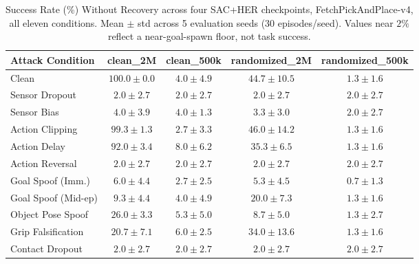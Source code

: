 \documentclass[conference]{IEEEtran}
\begin{document}
\begin{table}[t]
\centering
\caption{Success Rate (\%) Without Recovery across four SAC+HER checkpoints,
FetchPickAndPlace-v4, all eleven conditions. Mean $\pm$ std across 5 evaluation seeds
(30 episodes/seed). Values near $2\%$ reflect a near-goal-spawn floor, not task success.}
\label{tab:pnp_no_recovery}
\begin{tabular}{lcccc}
\toprule
\textbf{Attack Condition} & \textbf{clean\_2M} & \textbf{clean\_500k} & \textbf{randomized\_2M} & \textbf{randomized\_500k} \\
\midrule
Clean                 & $100.0 \pm 0.0$ & $4.0 \pm 4.9$  & $44.7 \pm 10.5$ & $1.3 \pm 1.6$ \\
Sensor Dropout        & $2.0 \pm 2.7$   & $2.0 \pm 2.7$  & $2.0 \pm 2.7$   & $2.0 \pm 2.7$ \\
Sensor Bias           & $4.0 \pm 3.9$   & $4.0 \pm 1.3$  & $3.3 \pm 3.0$   & $2.0 \pm 2.7$ \\
Action Clipping       & $99.3 \pm 1.3$  & $2.7 \pm 3.3$  & $46.0 \pm 14.2$ & $1.3 \pm 1.6$ \\
Action Delay          & $92.0 \pm 3.4$  & $8.0 \pm 6.2$  & $35.3 \pm 6.5$  & $1.3 \pm 1.6$ \\
Action Reversal       & $2.0 \pm 2.7$   & $2.0 \pm 2.7$  & $2.0 \pm 2.7$   & $2.0 \pm 2.7$ \\
Goal Spoof (Imm.)     & $6.0 \pm 4.4$   & $2.7 \pm 2.5$  & $5.3 \pm 4.5$   & $0.7 \pm 1.3$ \\
Goal Spoof (Mid-ep)   & $9.3 \pm 4.4$   & $4.0 \pm 4.9$  & $20.0 \pm 7.3$  & $1.3 \pm 1.6$ \\
Object Pose Spoof     & $26.0 \pm 3.3$  & $5.3 \pm 5.0$  & $8.7 \pm 5.0$   & $1.3 \pm 2.7$ \\
Grip Falsification    & $20.7 \pm 7.1$  & $6.0 \pm 2.5$  & $34.0 \pm 13.6$ & $1.3 \pm 1.6$ \\
Contact Dropout       & $2.0 \pm 2.7$   & $2.0 \pm 2.7$  & $2.0 \pm 2.7$   & $2.0 \pm 2.7$ \\
\bottomrule
\end{tabular}
\end{table}
\end{document}
